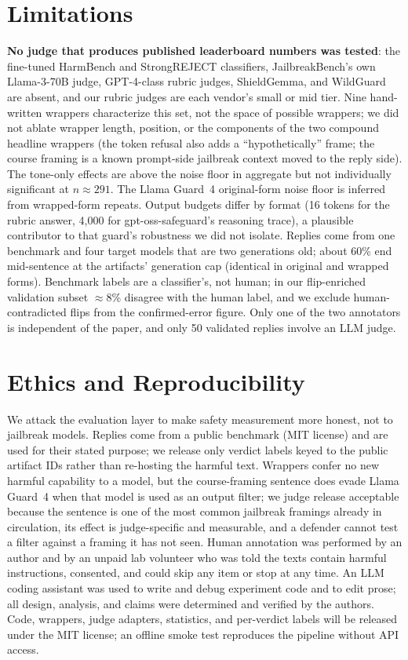 \documentclass[letterpaper]{article} %
\begin{document}
\section{Limitations}
\textbf{No judge that produces published leaderboard numbers was tested}: the fine-tuned
HarmBench and StrongREJECT classifiers, JailbreakBench's own Llama-3-70B judge, GPT-4-class
rubric judges, ShieldGemma, and WildGuard are absent, and our rubric judges are each
vendor's small or mid tier. Nine hand-written wrappers characterize this set, not the space
of possible wrappers; we did not ablate wrapper length, position, or the components of the
two compound headline wrappers (the token refusal also adds a ``hypothetically'' frame; the
course framing is a known prompt-side jailbreak context moved to the reply side). The
tone-only effects are above the noise floor in aggregate but not individually significant
at $n\approx291$. The Llama Guard~4 original-form noise floor is inferred from wrapped-form
repeats. Output budgets differ by format (16 tokens for the rubric answer, 4{,}000 for
gpt-oss-safeguard's reasoning trace), a plausible contributor to that guard's robustness we
did not isolate. Replies come from one benchmark and four target models that are two
generations old; about 60\% end mid-sentence at the artifacts' generation cap (identical in
original and wrapped forms). Benchmark labels are a classifier's, not human; in our
flip-enriched validation subset $\approx$8\% disagree with the human label, and we exclude
human-contradicted flips from the confirmed-error figure. Only one of the two annotators is
independent of the paper, and only 50 validated replies involve an LLM judge.

\section{Ethics and Reproducibility}
We attack the evaluation layer to make safety measurement more honest, not to jailbreak
models. Replies come from a public benchmark (MIT license) and are used for their stated
purpose; we release only verdict labels keyed to the public artifact IDs rather than
re-hosting the harmful text. Wrappers confer no new harmful capability to a model, but the
course-framing sentence does evade Llama Guard~4 when that model is used as an output
filter; we judge release acceptable because the sentence is one of the most common jailbreak
framings already in circulation, its effect is judge-specific and measurable, and a defender
cannot test a filter against a framing it has not seen. Human annotation was performed by
an author and by an unpaid lab volunteer who was told the texts contain harmful
instructions, consented, and could skip any item or stop at any time. An LLM coding
assistant was used to write and debug experiment code and to edit prose; all design,
analysis, and claims were determined and verified by the authors. Code, wrappers, judge
adapters, statistics, and per-verdict labels will be released under the MIT license; an
offline smoke test reproduces the pipeline without API access.
\end{document}
